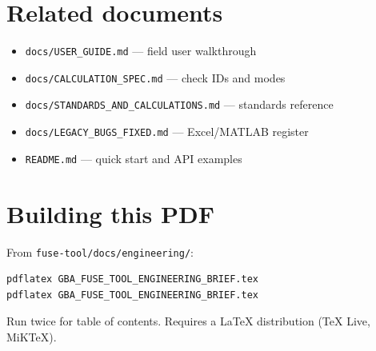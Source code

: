 \documentclass[11pt,a4paper]{report}
\begin{document}
\section{Related documents}

\begin{itemize}[noitemsep]
  \item \texttt{docs/USER\_GUIDE.md} --- field user walkthrough
  \item \texttt{docs/CALCULATION\_SPEC.md} --- check IDs and modes
  \item \texttt{docs/STANDARDS\_AND\_CALCULATIONS.md} --- standards reference
  \item \texttt{docs/LEGACY\_BUGS\_FIXED.md} --- Excel/MATLAB register
  \item \texttt{README.md} --- quick start and API examples
\end{itemize}

\section{Building this PDF}

From \texttt{fuse-tool/docs/engineering/}:
\begin{verbatim}
pdflatex GBA_FUSE_TOOL_ENGINEERING_BRIEF.tex
pdflatex GBA_FUSE_TOOL_ENGINEERING_BRIEF.tex
\end{verbatim}
Run twice for table of contents. Requires a LaTeX distribution (TeX Live, MiKTeX).
\end{document}
